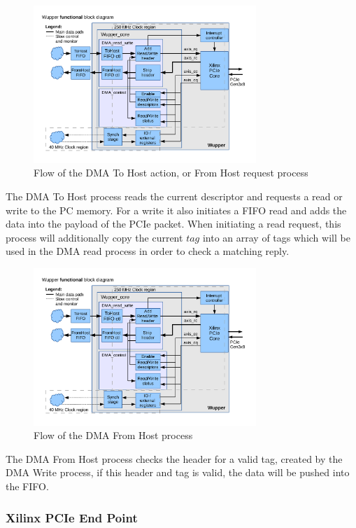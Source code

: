 \begin{figure}[H]
	\centering
	\includegraphics[trim=0mm 1cm 0mm 0cm, width=0.75\textwidth, page=4]{figures/wupper_structure.pdf}
	\caption{Flow of the DMA To Host action, or From Host request process}
	\label{fig:flowdma_write}
\end{figure}
The DMA To Host process reads the current descriptor and requests a read or write to the PC memory. For a write it also initiates a FIFO read and adds the data into the payload of the PCIe packet. When initiating a read request, this process will additionally copy the current $tag$ into an array of tags which will be used in the DMA read process in order to check a matching reply. 
\begin{figure}[H]
	\centering
	\includegraphics[trim=0mm 3cm 0mm 1cm, width=0.75\textwidth, page=5]{figures/wupper_structure.pdf}
	\caption{Flow of the DMA From Host process}
	\label{fig:flow_dma_read}
\end{figure}
The DMA From Host process checks the header for a valid tag, created by the DMA Write process, if this header and tag is valid, the data will be pushed into the FIFO.


\subsubsection {Xilinx PCIe End Point}


